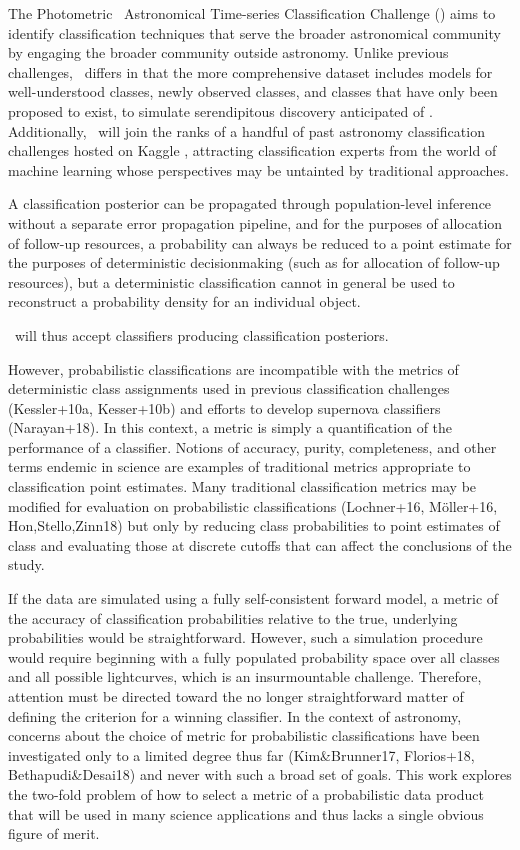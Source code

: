 The Photometric \lsst\ Astronomical Time-series Classification Challenge (\plasticc) aims to identify classification techniques that serve the broader astronomical community by engaging the broader community outside astronomy.
Unlike previous challenges, \plasticc\ differs in that the more comprehensive dataset includes models for well-understood classes, newly observed classes, and classes that have only been proposed to exist, to simulate serendipitous discovery anticipated of \lsst.
Additionally, \plasticc\ will join the ranks of a handful of past astronomy classification challenges hosted on Kaggle , attracting classification experts from the world of machine learning whose perspectives may be untainted by traditional approaches.

A classification posterior can be propagated through population-level inference without a separate error propagation pipeline, and for the purposes of allocation of follow-up resources, a probability can always be reduced to a point estimate for the purposes of deterministic decisionmaking (such as for allocation of follow-up resources), but a deterministic classification cannot in general be used to reconstruct a probability density for an individual object.

\plasticc\ will thus accept classifiers producing classification posteriors.

However, probabilistic classifications are incompatible with the metrics of deterministic class assignments used in previous classification challenges (Kessler+10a, Kesser+10b) and efforts to develop supernova classifiers (Narayan+18).
In this context, a metric is simply a quantification of the performance of a classifier.
Notions of accuracy, purity, completeness, and other terms endemic in science are examples of traditional metrics appropriate to classification point estimates.
Many traditional classification metrics may be modified for evaluation on probabilistic classifications (Lochner+16, M\"{o}ller+16, Hon,Stello,Zinn18) but only by reducing class probabilities to point estimates of class and evaluating those at discrete cutoffs that can affect the conclusions of the study.

If the data are simulated using a fully self-consistent forward model, a metric of the accuracy of classification probabilities relative to the true, underlying probabilities would be straightforward.
However, such a simulation procedure would require beginning with a fully populated probability space over all classes and all possible lightcurves, which is an insurmountable challenge.
Therefore, attention must be directed toward the no longer straightforward matter of defining the criterion for a winning classifier.
In the context of astronomy, concerns about the choice of metric for probabilistic classifications have been investigated only to a limited degree thus far (Kim\&Brunner17, Florios+18, Bethapudi\&Desai18) and never with such a broad set of goals.
This work explores the two-fold problem of how to select a metric of a probabilistic data product that will be used in many science applications and thus lacks a single obvious figure of merit.

